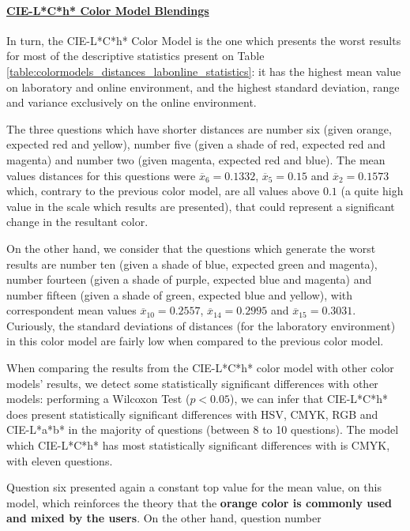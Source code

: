 \paragraph{\ul{CIE-L*C*h* Color Model Blendings}} \par
\label{par:lchcolormodel}
%
In turn, the CIE-L*C*h* Color Model is the one which presents the worst results for most of the descriptive statistics present on Table \ref{table:colormodels_distances_labonline_statistics}: it has the highest
mean value on laboratory and online environment, and the highest standard deviation, range and variance exclusively on the online environment. \par
%
The three questions which have shorter distances are number six (given orange, expected red and yellow), number five (given a shade of red, expected red and magenta) and number two (given magenta, expected red
and blue). The mean values distances for this questions were $\overline{x}_{6} = 0.1332$, $\overline{x}_{5} = 0.15$ and $\overline{x}_{2} = 0.1573$ which, contrary to the previous color model, are all values above $0.1$ (a quite
high value in the scale which results are presented), that could represent a significant change in the resultant color. \par
%
On the other hand, we consider that the questions which generate the worst results are number ten (given a shade of blue, expected green and magenta), number fourteen (given a shade of purple, expected blue and magenta) and number
fifteen (given a shade of green, expected blue and yellow), with correspondent mean values $\overline{x}_{10} = 0.2557$, $\overline{x}_{14} = 0.2995$ and $\overline{x}_{15} = 0.3031$. Curiously, the standard deviations of distances (for the
laboratory environment) in this color model are fairly low when compared to the previous color model. \par
%
When comparing the results from the CIE-L*C*h* color model with other color models' results, we detect some statistically significant differences with other models: performing a Wilcoxon Test ($p < 0.05$), we can infer that CIE-L*C*h* does
present statistically significant differences with HSV, CMYK, RGB and CIE-L*a*b* in the majority of questions (between 8 to 10 questions). The model which CIE-L*C*h* has most statistically significant differences with is CMYK, with eleven questions. \par
%
Question six presented again a constant top value for the mean value, on this model, which reinforces the theory that the \textbf{orange color is commonly used and mixed by the users}. On the other hand, question number
